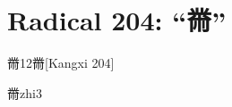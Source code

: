 
\section*{Radical 204: ``⿋''}

\begin{Entry}{黹}{12}{⿋}[Kangxi 204]
  \begin{Phonetics}{黹}{zhi3}
  \end{Phonetics}
\end{Entry}


